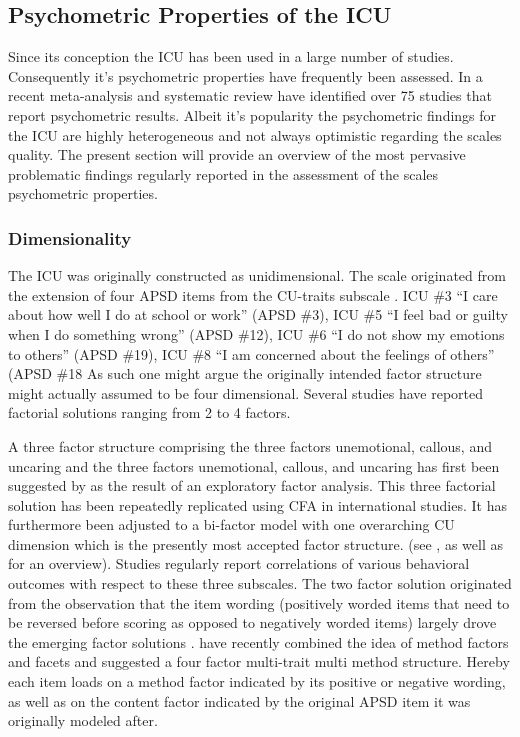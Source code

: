 \subsection{Psychometric Properties of the ICU}
Since its conception the ICU has been used in a large number of studies.
Consequently it's psychometric properties have frequently been assessed.
In a recent meta-analysis and systematic review \textcites{cardinale_reliability_2017}
have identified over 75 studies that report psychometric results.
Albeit it's popularity the psychometric findings for the ICU are highly heterogeneous and not always optimistic regarding the scales quality.
The present section will provide an overview of the most pervasive problematic findings regularly reported in the assessment of the scales psychometric properties. 

\subsubsection{Dimensionality}
The ICU was originally constructed as unidimensional.
The scale originated from the extension of four APSD items from the CU-traits subscale \parencite{kimonis_using_2015}.
ICU \#3  “I care about how well I do at school or work” (APSD \#3),
ICU \#5  “I feel bad or guilty when I do something wrong” (APSD \#12),
ICU \#6 “I do not show my emotions to others” (APSD \#19),
ICU \#8  “I am concerned about the feelings of others” (APSD \#18
As such one might argue the originally intended factor structure might actually assumed to be four dimensional.
Several studies have reported factorial solutions ranging from 2 to 4 factors. 

A three factor structure comprising the three factors unemotional, callous, and uncaring and the three factors unemotional, callous, and uncaring has first been suggested by \textcites{essau_callous-unemotional_2006}  
as the result of an exploratory factor analysis. 
This three factorial solution has been repeatedly replicated using CFA in international studies. It has furthermore been adjusted to a bi-factor model
with one overarching CU dimension  which is the presently most accepted factor structure.
(see \textcites{cardinale_reliability_2017}, as well as \textcites{kliem_factor_2019} for an overview).
Studies regularly report correlations of various behavioral outcomes with respect to these three subscales.
The two factor solution originated from the observation that the item wording (positively worded items that need to be reversed before scoring as opposed to negatively worded items)
largely drove the emerging factor solutions \parencite{cardinale_reliability_2017}.
\textcites{kliem_factor_2019} have recently combined the idea of method factors and facets and suggested a four factor multi-trait multi method structure.
Hereby each item loads on a method factor indicated by its positive or negative wording, as well as on the content factor indicated by the original APSD item it was originally modeled after.

